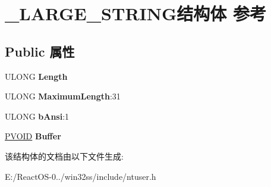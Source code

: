 \hypertarget{struct___l_a_r_g_e___s_t_r_i_n_g}{}\section{\+\_\+\+L\+A\+R\+G\+E\+\_\+\+S\+T\+R\+I\+N\+G结构体 参考}
\label{struct___l_a_r_g_e___s_t_r_i_n_g}
\subsection*{Public 属性}
\begin{DoxyCompactItemize}
\item 
\mbox{\label{struct___l_a_r_g_e___s_t_r_i_n_g_a1e3165237bb3a72f37828c3fd81d8d21}} 
U\+L\+O\+NG {\bfseries Length}
\item 
\mbox{\label{struct___l_a_r_g_e___s_t_r_i_n_g_a221247e331f8577ff840858d3717afc8}} 
U\+L\+O\+NG {\bfseries Maximum\+Length}\+:31
\item 
\mbox{\label{struct___l_a_r_g_e___s_t_r_i_n_g_a2bb2897372f07792bdd73c54bcb734d4}} 
U\+L\+O\+NG {\bfseries b\+Ansi}\+:1
\item 
\mbox{\label{struct___l_a_r_g_e___s_t_r_i_n_g_ab701ca118bebd72d8959c7d70cbed00c}} 
\hyperlink{interfacevoid}{P\+V\+O\+ID} {\bfseries Buffer}
\end{DoxyCompactItemize}


该结构体的文档由以下文件生成\+:\begin{DoxyCompactItemize}
\item 
E\+:/\+React\+O\+S-\/0../win32ss/include/ntuser.\+h\end{DoxyCompactItemize}
